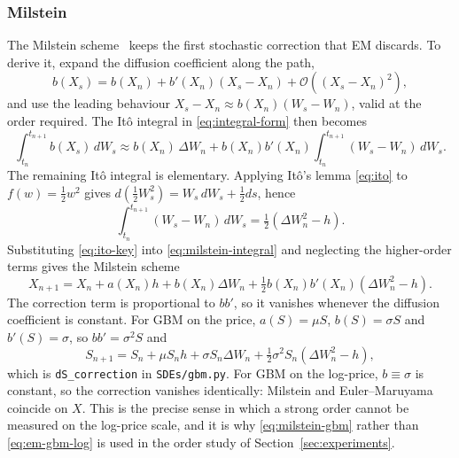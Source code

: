 \documentclass[11pt,a4paper]{article}
\theoremstyle{definition}
\theoremstyle{remark}
\begin{document}
\subsubsection{Milstein}
The Milstein scheme~\cite{milstein} keeps the first stochastic correction that EM discards. To derive it, expand the diffusion coefficient along the path,
\begin{equation}
    b(X_s) = b(X_n) + b'(X_n)(X_s - X_n) + \mathcal{O}\!\left( (X_s - X_n)^2 \right),
\end{equation}
and use the leading behaviour $X_s - X_n \approx b(X_n)(W_s - W_n)$, valid at the order required. The It\^o integral in \eqref{eq:integral-form} then becomes
\begin{equation}
    \int_{t_n}^{t_{n+1}} b(X_s)\, dW_s
    \approx b(X_n)\, \Delta W_n + b(X_n) b'(X_n) \int_{t_n}^{t_{n+1}} (W_s - W_n)\, dW_s .
    \label{eq:milstein-integral}
\end{equation}
The remaining It\^o integral is elementary. Applying It\^o's lemma \eqref{eq:ito} to $f(w) = \tfrac12 w^2$ gives $d\!\left( \tfrac12 W_s^2 \right) = W_s\, dW_s + \tfrac12 ds$, hence
\begin{equation}
    \int_{t_n}^{t_{n+1}} (W_s - W_n)\, dW_s = \tfrac12 \left( \Delta W_n^2 - h \right).
    \label{eq:ito-key}
\end{equation}
Substituting \eqref{eq:ito-key} into \eqref{eq:milstein-integral} and neglecting the higher-order terms gives the Milstein scheme
\begin{equation}
    X_{n+1} = X_n + a(X_n) h + b(X_n) \Delta W_n + \tfrac12 b(X_n) b'(X_n) \left( \Delta W_n^2 - h \right).
    \label{eq:milstein-general}
\end{equation}
The correction term is proportional to $b b'$, so it vanishes whenever the diffusion coefficient is constant.
For GBM on the price, $a(S) = \mu S$, $b(S) = \sigma S$ and $b'(S) = \sigma$, so $b b' = \sigma^2 S$ and
\begin{equation}
    S_{n+1} = S_n + \mu S_n h + \sigma S_n \Delta W_n + \tfrac12 \sigma^2 S_n \left( \Delta W_n^2 - h \right),
    \label{eq:milstein-gbm}
\end{equation}
which is \texttt{dS\_correction} in \texttt{SDEs/gbm.py}. For GBM on the log-price, $b \equiv \sigma$ is constant, so the correction vanishes identically: Milstein and Euler--Maruyama coincide on $X$. This is the precise sense in which a strong order cannot be measured on the log-price scale, and it is why \eqref{eq:milstein-gbm} rather than \eqref{eq:em-gbm-log} is used in the order study of Section~\ref{sec:experiments}.
\end{document}
